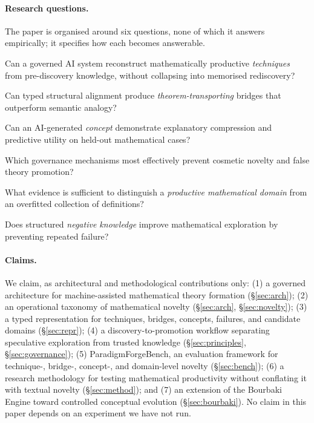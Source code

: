 \documentclass[11pt]{article}
\theoremstyle{definition}
\theoremstyle{remark}
\newcommand{\pfbench}{ParadigmForgeBench}
\begin{document}
\paragraph{Research questions.}
The paper is organised around six questions, none of which it answers empirically; it specifies how
each becomes answerable.
\begin{description}[leftmargin=2.4em,style=nextline,itemsep=1pt]
  \item[RQ1] Can a governed AI system reconstruct mathematically productive \emph{techniques} from
  pre-discovery knowledge, without collapsing into memorised rediscovery?
  \item[RQ2] Can typed structural alignment produce \emph{theorem-transporting} bridges that
  outperform semantic analogy?
  \item[RQ3] Can an AI-generated \emph{concept} demonstrate explanatory compression and predictive
  utility on held-out mathematical cases?
  \item[RQ4] Which governance mechanisms most effectively prevent cosmetic novelty and false theory
  promotion?
  \item[RQ5] What evidence is sufficient to distinguish a \emph{productive mathematical domain} from
  an overfitted collection of definitions?
  \item[RQ6] Does structured \emph{negative knowledge} improve mathematical exploration by
  preventing repeated failure?
\end{description}

\paragraph{Claims.}
We claim, as architectural and methodological contributions only:
(1) a governed architecture for machine-assisted mathematical theory formation
(\S\ref{sec:arch});
(2) an operational taxonomy of mathematical novelty (\S\ref{sec:arch}, \S\ref{sec:novelty});
(3) a typed representation for techniques, bridges, concepts, failures, and candidate domains
(\S\ref{sec:repr});
(4) a discovery-to-promotion workflow separating speculative exploration from trusted knowledge
(\S\ref{sec:principles}, \S\ref{sec:governance});
(5) \pfbench{}, an evaluation framework for technique-, bridge-, concept-, and domain-level novelty
(\S\ref{sec:bench});
(6) a research methodology for testing mathematical productivity without conflating it with textual
novelty (\S\ref{sec:method}); and
(7) an extension of the Bourbaki Engine toward controlled conceptual evolution (\S\ref{sec:bourbaki}).
No claim in this paper depends on an experiment we have not run.
\end{document}
